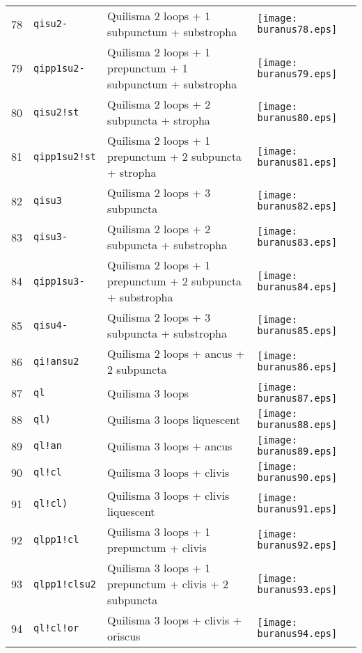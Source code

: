 \documentclass{scrarticle}
\begin{document}
\begin{longtable}{l|l|l|l}
78 & \texttt{qisu2-} & Quilisma 2 loops + 1 subpunctum + substropha & \texttt{[image: buranus78.eps]} \\
79 & \texttt{qipp1su2-} & Quilisma 2 loops + 1 prepunctum + 1 subpunctum + substropha & \texttt{[image: buranus79.eps]} \\
80 & \texttt{qisu2!st} & Quilisma 2 loops + 2 subpuncta + stropha & \texttt{[image: buranus80.eps]} \\
81 & \texttt{qipp1su2!st} & Quilisma 2 loops + 1 prepunctum + 2 subpuncta + stropha & \texttt{[image: buranus81.eps]} \\
82 & \texttt{qisu3} & Quilisma 2 loops + 3 subpuncta & \texttt{[image: buranus82.eps]} \\
83 & \texttt{qisu3-} & Quilisma 2 loops + 2 subpuncta + substropha & \texttt{[image: buranus83.eps]} \\
84 & \texttt{qipp1su3-} & Quilisma 2 loops + 1 prepunctum + 2 subpuncta + substropha & \texttt{[image: buranus84.eps]} \\
85 & \texttt{qisu4-} & Quilisma 2 loops + 3 subpuncta + substropha & \texttt{[image: buranus85.eps]} \\
86 & \texttt{qi!ansu2} & Quilisma 2 loops + ancus + 2 subpuncta & \texttt{[image: buranus86.eps]} \\
87 & \texttt{ql} & Quilisma 3 loops & \texttt{[image: buranus87.eps]} \\
88 & \texttt{ql)} & Quilisma 3 loops liquescent & \texttt{[image: buranus88.eps]} \\
89 & \texttt{ql!an} & Quilisma 3 loops + ancus & \texttt{[image: buranus89.eps]} \\
90 & \texttt{ql!cl} & Quilisma 3 loops + clivis & \texttt{[image: buranus90.eps]} \\
91 & \texttt{ql!cl)} & Quilisma 3 loops + clivis liquescent & \texttt{[image: buranus91.eps]} \\
92 & \texttt{qlpp1!cl} & Quilisma 3 loops + 1 prepunctum + clivis & \texttt{[image: buranus92.eps]} \\
93 & \texttt{qlpp1!clsu2} & Quilisma 3 loops + 1 prepunctum + clivis + 2 subpuncta & \texttt{[image: buranus93.eps]} \\
94 & \texttt{ql!cl!or} & Quilisma 3 loops + clivis + oriscus & \texttt{[image: buranus94.eps]} \\

\end{longtable}
\end{document}
